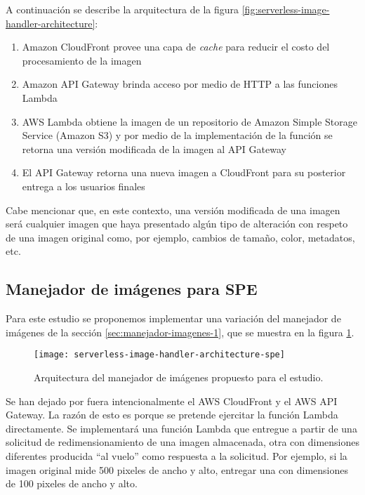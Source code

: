 A continuación se describe la arquitectura de la figura \ref{fig:serverless-image-handler-architecture}:
\begin{enumerate}
    \item Amazon CloudFront provee una capa de \emph{cache} para reducir el costo del procesamiento de la imagen
    \item Amazon API Gateway brinda acceso por medio de HTTP a las funciones Lambda
    \item AWS Lambda obtiene la imagen de un repositorio de Amazon Simple Storage Service (Amazon S3) y por medio de la implementación de la función se retorna una versión modificada de la imagen al API Gateway
    \item El API Gateway retorna una nueva imagen a CloudFront para su posterior entrega a los usuarios finales
\end{enumerate}

Cabe mencionar que, en este contexto, una versión modificada de una imagen será cualquier imagen que haya presentado algún tipo de alteración con respeto de una imagen original como, por ejemplo, cambios de tamaño, color, metadatos, etc.

\subsection{Manejador de imágenes para SPE} \label{sec:manejador-imagenes-spe}
Para este estudio se proponemos implementar una variación del manejador de imágenes de la sección \ref{sec:manejador-imagenes-1}, que se muestra en la figura \ref{fig:serverless-image-handler-architecture-spe}.

\begin{figure}[h]
  \centering
  \texttt{[image: serverless-image-handler-architecture-spe]}
  \caption[Arquitectura del manejador de imágenes propuesto para el estudio]{Arquitectura del manejador de imágenes propuesto para el estudio.}
  \label{fig:serverless-image-handler-architecture-spe}
\end{figure}

Se han dejado por fuera intencionalmente el AWS CloudFront y el AWS API Gateway. La razón de esto es porque se pretende ejercitar la función Lambda directamente. Se implementará una función Lambda que entregue a partir de una solicitud de redimensionamiento de una imagen almacenada, otra con dimensiones diferentes producida ``al vuelo'' como respuesta a la solicitud. Por ejemplo, si la imagen original mide 500 pixeles de ancho y alto, entregar una con dimensiones de 100 pixeles de ancho y alto. 

